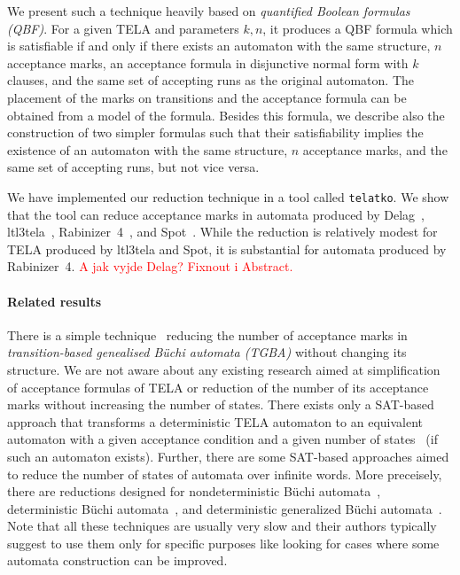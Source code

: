 \documentclass[a4paper,UKenglish,cleveref, autoref, thm-restate]{lipics-v2021}
\newcommand{\todo}[1]{\textcolor{red}{#1}}
\begin{document}
We present such a technique heavily based on \emph{quantified Boolean
  formulas (QBF)}. For a given TELA and parameters $k,n$, it produces
a QBF formula which is satisfiable if and only if there exists an
automaton with the same structure, $n$ acceptance marks, an acceptance
formula in disjunctive normal form with $k$ clauses, and the same set
of accepting runs as the original automaton. The placement of the
marks on transitions and the acceptance formula can be obtained from a
model of the formula. Besides this formula, we describe also the
construction of two simpler formulas such that their satisfiability
implies the existence of an automaton with the same structure, $n$
acceptance marks, and the same set of accepting runs, but not vice
versa.

We have implemented our reduction technique in a tool called
\texttt{telatko}. We show that the tool can reduce acceptance marks in
automata produced by Delag~\cite{muller.17.gandalf},
ltl3tela~\cite{major.19.atva}, Rabinizer~4~\cite{kretinsky.18.cav},
and Spot~\cite{duret.16.atva2}.  While the reduction is relatively
modest for TELA produced by ltl3tela and Spot, it is substantial for
automata produced by Rabinizer~4. \todo{A jak vyjde Delag? Fixnout i
  Abstract.}

\paragraph*{Related results}
There is a simple technique~\cite{babiak.13.spin} reducing the number
of acceptance marks in \emph{transition-based genealised Büchi
  automata (TGBA)} without changing its structure. We are not aware
about any existing research aimed at simplification of acceptance
formulas of TELA or reduction of the number of its acceptance marks
without increasing the number of states. There exists only a SAT-based
approach that transforms a deterministic TELA automaton to an
equivalent automaton with a given acceptance condition and a given
number of states~\cite{baarir.15.lpar} (if such an automaton
exists). Further, there are some SAT-based approaches aimed to reduce
the number of states of automata over infinite words. More preceisely,
there are reductions designed for nondeterministic Büchi
automata~\cite{ehlers.10.spin}, deterministic Büchi
automata~\cite{ehlers.10.sat}, and deterministic generalized Büchi
automata~\cite{baarir.14.forte}. Note that all these techniques are
usually very slow and their authors typically suggest to use them only
for specific purposes like looking for cases where some automata
construction can be improved.
\end{document}
